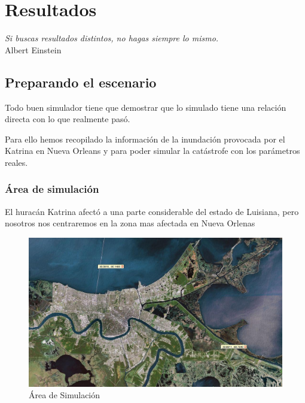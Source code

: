 
\chapter*{Resultados} \label{cap6}

\begin{flushright}
\begin{minipage}{7.85cm}
    {\em Si buscas resultados distintos, no hagas siempre lo mismo.} \\ Albert
    Einstein
\end{minipage}
\end{flushright}

\vspace*{5mm}

\section*{Preparando el escenario}

Todo buen simulador tiene que demostrar que lo simulado tiene una relación
directa con lo que realmente pasó.

Para ello hemos recopilado la información de la inundación provocada por el
Katrina en Nueva Orleans y para poder simular la catástrofe con los parámetros
reales.

\subsection*{Área de simulación}

El huracán Katrina afectó a una parte considerable del estado de Luisiana, pero
nosotros nos centraremos en la zona mas afectada en Nueva Orlenas

\begin{figure}[H]
 \centering
 \includegraphics[width=120mm]{figuras/cap6/NOarea1.png}
 \caption{Área de Simulación}
\end{figure}

